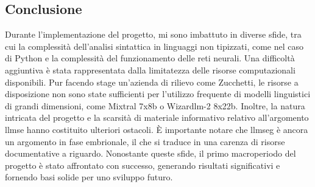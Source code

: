     \subsection{Conclusione}
        Durante l'implementazione del progetto, mi sono imbattuto in diverse sfide, tra cui la complessità dell'analisi sintattica in linguaggi non tipizzati, 
        come nel caso di Python e la complessità del funzionamento delle reti neurali. Una difficoltà aggiuntiva è stata rappresentata dalla limitatezza delle risorse computazionali disponibili. 
        Pur facendo stage un'azienda di rilievo come Zucchetti, le risorse a disposizione non sono state sufficienti per l'utilizzo frequente di modelli linguistici di grandi dimensioni, 
        come Mixtral 7x8b o Wizardlm-2 8x22b. Inoltre, la natura intricata del progetto e la scarsità di materiale informativo relativo all'argomento \gls{llmse} hanno costituito ulteriori ostacoli. 
        È importante notare che \gls{llmseg} è ancora un argomento in fase embrionale, il che si traduce in una carenza di risorse documentative a riguardo. Nonostante queste sfide, 
        il primo macroperiodo del progetto è stato affrontato con successo, generando risultati significativi e fornendo basi solide per uno sviluppo futuro.
\newpage